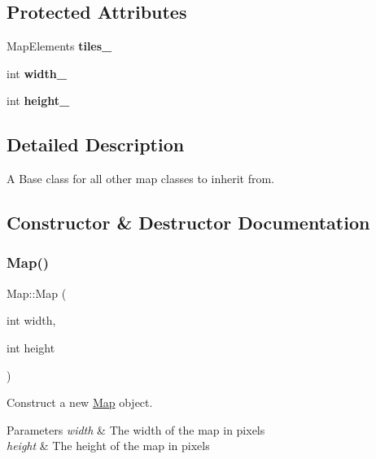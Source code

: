\subsection*{Protected Attributes}
\begin{DoxyCompactItemize}
\item 
\mbox{\label{classMap_ab134971f0ca070bcf982391c5de2d913}} 
Map\+Elements {\bfseries tiles\+\_\+}
\item 
\mbox{\label{classMap_a6c90432856cd75ce1e19c4138caf82e7}} 
int {\bfseries width\+\_\+}
\item 
\mbox{\label{classMap_ad8bd63d7d81e3513726c55a1682afc52}} 
int {\bfseries height\+\_\+}
\end{DoxyCompactItemize}


\subsection{Detailed Description}
A Base class for all other map classes to inherit from. 



\subsection{Constructor \& Destructor Documentation}
\mbox{\label{classMap_a8497952fd6e1f0584d868e6ceb97d42d}} 
\subsubsection{\texorpdfstring{Map()}{Map()}}
{\footnotesize\ttfamily Map\+::\+Map (\begin{DoxyParamCaption}\item[{int}]{width,  }\item[{int}]{height }\end{DoxyParamCaption})}



Construct a new \mbox{\hyperlink{classMap}{Map}} object. 


\begin{DoxyParams}{Parameters}
{\em width} & The width of the map in pixels \\
\hline
{\em height} & The height of the map in pixels \\
\hline
\end{DoxyParams}
\mbox{\label{classMap_a1debdd8c6fec2993906ec9626045c80c}} 

